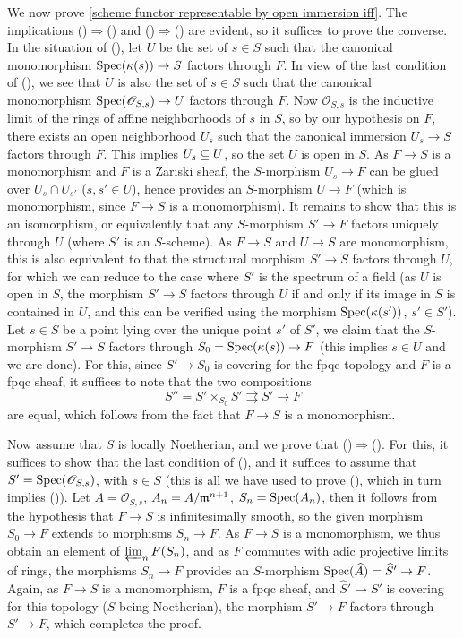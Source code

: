 We now prove \cref{scheme functor representable by open immersion iff}. The implications ()$\Rightarrow$() and ()$\Rightarrow$() are evident, so it suffices to prove the converse. In the situation of (), let $U$ be the set of $s\in S$ such that the canonical monomorphism $\mathrm{Spec}(\kappa(s))\to S$ factors through $F$. In view of the last condition of (), we see that $U$ is also the set of $s\in S$ such that the canonical monomorphism $\mathrm{Spec}(\mathscr{O}_{S,s})\to U$ factors through $F$. Now $\mathscr{O}_{S,s}$ is the inductive limit of the rings of affine neighborhoods of $s$ in $S$, so by our hypothesis on $F$, there exists an open neighborhood $U_s$ such that the canonical immersion $U_s\to S$ factors through $F$. This implies $U_s\subseteq U$, so the set $U$ is open in $S$. As $F\to S$ is a monomorphism and $F$ is a Zariski sheaf, the $S$-morphism $U_s\to F$ can be glued over $U_s\cap U_{s'}$ ($s,s'\in U$), hence provides an $S$-morphism $U\to F$ (which is monomorphism, since $F\to S$ is a monomorphism). It remains to show that this is an isomorphism, or equivalently that any $S$-morphism $S'\to F$ factors uniquely through $U$ (where $S'$ is an $S$-scheme). As $F\to S$ and $U\to S$ are monomorphism, this is also equivalent to that the structural morphism $S'\to S$ factors through $U$, for which we can reduce to the case where $S'$ is the spectrum of a field (as $U$ is open in $S$, the morphism $S'\to S$ factors through $U$ if and only if its image in $S$ is contained in $U$, and this can be verified using the morphism $\mathrm{Spec}(\kappa(s'))$, $s'\in S'$). Let $s\in S$ be a point lying over the unique point $s'$ of $S'$, we claim that the $S$-morphism $S'\to S$ factors through $S_0=\mathrm{Spec}(\kappa(s))\to F$ (this implies $s\in U$ and we are done). For this, since $S'\to S_0$ is covering for the fpqc topology and $F$ is a fpqc sheaf, it suffices to note that the two compositions
\[S''=S'\times_{S_0}S'\rightrightarrows S'\to F\]
are equal, which follows from the fact that $F\to S$ is a monomorphism.\par
Now assume that $S$ is locally Noetherian, and we prove that ()$\Rightarrow$(). For this, it suffices to show that the last condition of (), and it suffices to assume that $S'=\mathrm{Spec}(\mathscr{O}_{S,s})$, with $s\in S$ (this is all we have used to prove (), which in turn implies ()). Let $A=\mathscr{O}_{S,s}$, $A_n=A/\mathfrak{m}^{n+1}$, $S_n=\mathrm{Spec}(A_n)$, then it follows from the hypothesis that $F\to S$ is infinitesimally smooth, so the given morphism $S_0\to F$ extends to morphisms $S_n\to F$. As $F\to S$ is a monomorphism, we thus obtain an element of $\varprojlim_nF(S_n)$, and as $F$ commutes with adic projective limits of rings, the morphisms $S_n\to F$ provides an $S$-morphism $\mathrm{Spec}(\widehat{A})=\widehat{S}'\to F$. Again, as $F\to S$ is a monomorphism, $F$ is a fpqc sheaf, and $\widehat{S}'\to S'$ is covering for this topology ($S$ being Noetherian), the morphism $\widehat{S}'\to F$ factors through $S'\to F$, which completes the proof.

